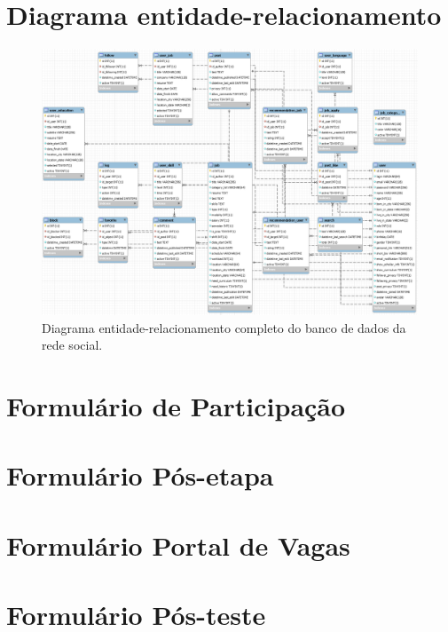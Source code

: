 \appendix

\chapter{Diagrama entidade-relacionamento}
\label{appendDER}
\begin{figure}[ht]
    \caption{Diagrama entidade-relacionamento completo do banco de dados da rede social.}
       	\begin{center}
            \includegraphics[width=1\textwidth]{figuras/der-completo.png}
        \end{center}
    \label{appendDERimg}
\end{figure}

\chapter{Formulário de Participação}
\label{appendFormPortal}


\chapter{Formulário Pós-etapa}
\label{appendFormStepPortal}


\chapter{Formulário Portal de Vagas}
\label{appendFormPDV}


\chapter{Formulário Pós-teste}
\label{appendFormFinalPortal}
